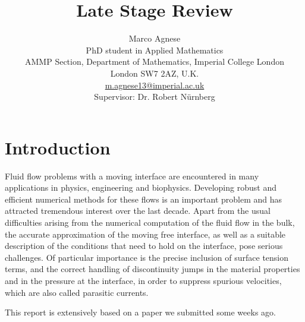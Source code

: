 \documentclass[a4paper,11pt,onecolumn]{article}
\begin{document}
\title{Late Stage Review}
\author{Marco Agnese \\
PhD student in Applied Mathematics \\
AMMP Section, Department of Mathematics, Imperial College London \\
London SW7 2AZ, U.K. \\
\url{m.agnese13@imperial.ac.uk}\\
Supervisor: Dr. Robert N\"urnberg}

\maketitle

\captionsetup[subfigure]{labelformat=empty} %

\section{Introduction}\label{sec:introduction}
Fluid flow problems with a moving interface are encountered in many
applications in physics, engineering and biophysics. Developing robust and
efficient numerical methods for these flows is an important problem and
has attracted tremendous interest over the last decade. Apart from the usual
difficulties arising from the numerical computation of the fluid flow in the
bulk, the accurate approximation of the moving free interface, as well as a
suitable description of the conditions that need to hold on the interface,
pose serious challenges. Of particular importance is the precise inclusion of
surface tension terms, and the correct handling of discontinuity jumps in the
material properties and in the pressure at the interface, in order to suppress
spurious velocities, which are also called parasitic currents.

This report is extensively based on a paper we submitted some weeks ago.
\end{document}
